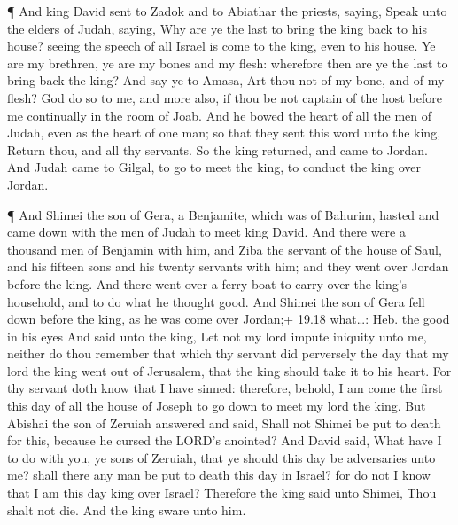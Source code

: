  ¶ And king David sent to Zadok and to Abiathar the
priests, saying, Speak unto the elders of Judah, saying, Why are ye the
last to bring the king back to his house? seeing the speech of all
Israel is come to the king, even to his house.  Ye are my
brethren, ye are my bones and my flesh: wherefore then are ye the last
to bring back the king?  And say ye to Amasa, Art thou not
of my bone, and of my flesh? God do so to me, and more also, if thou be
not captain of the host before me continually in the room of Joab.
 And he bowed the heart of all the men of Judah, even as
the heart of one man; so that they sent this word unto the king, Return
thou, and all thy servants.  So the king returned, and came
to Jordan. And Judah came to Gilgal, to go to meet the king, to conduct
the king over Jordan.

 ¶ And Shimei the son of Gera, a Benjamite, which was of
Bahurim, hasted and came down with the men of Judah to meet king David.
 And there were a thousand men of Benjamin with him, and
Ziba the servant of the house of Saul, and his fifteen sons and his
twenty servants with him; and they went over Jordan before the king.
 And there went over a ferry boat to carry over the king's
household, and to do what he thought good. And Shimei the son of Gera
fell down before the king, as he was come over Jordan;+ 19.18
what\ldots: Heb. the good in his eyes  And said unto the
king, Let not my lord impute iniquity unto me, neither do thou remember
that which thy servant did perversely the day that my lord the king went
out of Jerusalem, that the king should take it to his heart.
 For thy servant doth know that I have sinned: therefore,
behold, I am come the first this day of all the house of Joseph to go
down to meet my lord the king.  But Abishai the son of
Zeruiah answered and said, Shall not Shimei be put to death for this,
because he cursed the LORD's anointed?  And David said,
What have I to do with you, ye sons of Zeruiah, that ye should this day
be adversaries unto me? shall there any man be put to death this day in
Israel? for do not I know that I am this day king over Israel?
 Therefore the king said unto Shimei, Thou shalt not die.
And the king sware unto him.

